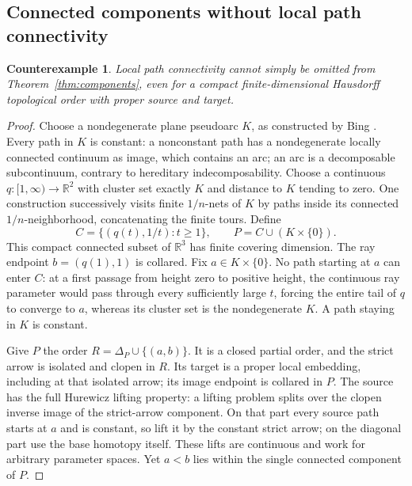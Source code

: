 \documentclass[11pt,a4paper]{article}
\newtheorem{counterexample}[theorem]{Counterexample}
\theoremstyle{definition}
\newcommand{\R}{\mathbb R}
\begin{document}
\subsection{Connected components without local path connectivity}
\begin{counterexample}\label{ex:pseudoarc}
Local path connectivity cannot simply be omitted from
Theorem~\ref{thm:components}, even for a compact finite-dimensional
Hausdorff topological order with proper source and target.
\end{counterexample}
\begin{proof}
Choose a nondegenerate plane pseudoarc $K$, as constructed by Bing
\cite[Example~1, pp.~43--44]{Bing}. Every path in $K$ is constant:
a nonconstant path has a nondegenerate locally connected continuum as
image, which contains an arc; an arc is a decomposable subcontinuum,
contrary to hereditary indecomposability.
Choose a continuous $q:[1,\infty)\to\R^2$ with cluster set exactly
$K$ and distance to $K$ tending to zero. One construction successively
visits finite $1/n$-nets of $K$ by paths inside its connected
$1/n$-neighborhood, concatenating the finite tours. Define
\[
 C=\{(q(t),1/t):t\ge1\},\qquad P=C\cup(K\times\{0\}).
\]
This compact connected subset of $\R^3$ has finite covering dimension.
The ray endpoint $b=(q(1),1)$ is collared. Fix $a\in K\times\{0\}$.
No path starting at $a$ can enter $C$: at a first passage from height
zero to positive height, the continuous ray parameter would pass
through every sufficiently large $t$, forcing the entire tail of $q$
to converge to $a$, whereas its cluster set is the nondegenerate $K$.
A path staying in $K$ is constant.

Give $P$ the order $R=\Delta_P\cup\{(a,b)\}$.
It is a closed partial order, and the strict arrow is isolated and
clopen in $R$. Its target is a proper local embedding, including at
that isolated arrow; its image endpoint is collared in $P$.
The source has the full Hurewicz lifting property: a lifting problem
splits over the clopen inverse image of the strict-arrow component.
On that part every source path starts at $a$ and is constant, so lift
it by the constant strict arrow; on the diagonal part use the base
homotopy itself. These lifts are continuous and work for arbitrary
parameter spaces. Yet $a<b$ lies within the single connected component
of $P$.
\end{proof}
\end{document}
